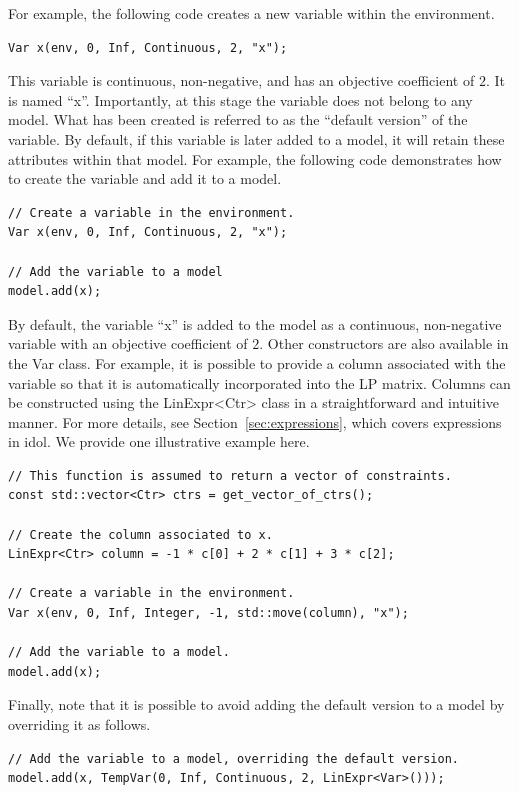 For example, the following code creates a new variable within the environment.
%
\begin{lstlisting}
Var x(env, 0, Inf, Continuous, 2, "x");
\end{lstlisting}
This variable is continuous, non-negative, and has an objective coefficient of
$2$. It is named ``\textsf{x}''. Importantly, at this stage the variable does
not belong to any model. What has been created is referred to as the ``default
version'' of the variable. By default, if this variable is later added to a
model, it will retain these attributes within that model. For example, the
following code demonstrates how to create the variable and add it to a model.
%
\begin{lstlisting}
// Create a variable in the environment.
Var x(env, 0, Inf, Continuous, 2, "x");

// Add the variable to a model 
model.add(x);
\end{lstlisting}

By default, the variable ``\textsf{x}'' is added to the model as a continuous,
non-negative variable with an objective coefficient of $2$. Other constructors
are also available in the \textsf{Var} class. For example, it is possible to
provide a column associated with the variable so that it is automatically
incorporated into the LP matrix. Columns can be constructed using the
\textsf{LinExpr<Ctr>} class in a straightforward and intuitive manner. For
more details, see Section~\ref{sec:expressions}, which covers expressions in
\textsf{idol}. We provide one illustrative example here.
%
\begin{lstlisting}
// This function is assumed to return a vector of constraints.
const std::vector<Ctr> ctrs = get_vector_of_ctrs(); 

// Create the column associated to x.
LinExpr<Ctr> column = -1 * c[0] + 2 * c[1] + 3 * c[2];

// Create a variable in the environment.
Var x(env, 0, Inf, Integer, -1, std::move(column), "x");

// Add the variable to a model.
model.add(x);
\end{lstlisting}

Finally, note that it is possible to avoid adding the default version to a
model by overriding it as follows. 

\begin{lstlisting}
// Add the variable to a model, overriding the default version. 
model.add(x, TempVar(0, Inf, Continuous, 2, LinExpr<Var>()));
\end{lstlisting}

